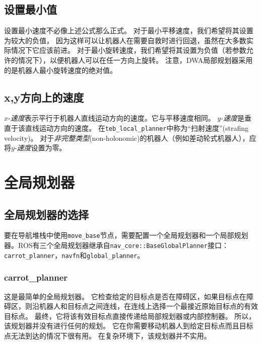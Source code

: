 \subsection[Setting minimum values]{设置最小值}

设置最小速度不必像上述公式那么正式。 
对于最小平移速度，我们希望将其设置为较大的负值，
因为这样可以让机器人在需要自救时进行回退，虽然在大多数实际情况下它应该前进。
对于最小旋转速度，我们希望将其设置为负值（若参数允许的情况下），以便机器人可以在任一方向上旋转。 
注意，DWA局部规划器采用的是机器人最小旋转速度的绝对值。


\subsection[Velocity in x, y direction]{x,y方向上的速度}

{$x$}-\emph{速度}表示平行于机器人直线运动方向的速度。它与平移速度相同。
$y$-\emph{速度}是垂直于该直线运动方向的速度。
在\texttt{teb_local_planner}中称为“扫射速度”(strafing velocity)。
对于\emph{非完整类型}(non-holonomic)的机器人（例如差动轮式机器人），应将$y$-\emph{速度}设置为零。




\section[Global Planner]{全局规划器}

\subsection[Global Planner Selection]{全局规划器的选择}
要在导航堆栈中使用\texttt{move_base}节点，需要配置一个全局规划器和一个局部规划器。ROS有三个全局规划器继承自\texttt{nav_core::BaseGlobalPlanner}接口：\texttt{carrot_planner}，\texttt{navfn}和\texttt{global_planner}。

\subsubsection{carrot\_planner}

这是最简单的全局规划器。 
它检查给定的目标点是否在障碍区，如果目标点在障碍区，则沿机器人和目标点之间连线，在连线上选择一个最接近原始目标点的有效目标点。 
最终，它将该有效目标点直接传递给局部规划器或内部控制器。
所以，该规划器并没有进行任何的规划。
它在你需要移动机器人到给定目标点而且目标点无法到达的情况下很有用。
在复杂环境下，该规划器并不实用。

